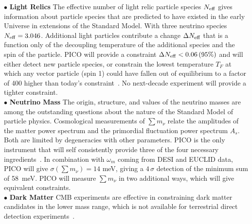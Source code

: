 \documentclass[PICOAPC.tex]{subfiles}
\begin{document}
$\bullet$ {\bf Light Relics} \hspace{0.1in} The effective number of light relic particle species ${N_{\rm eff}}$ gives information about particle species that are predicted to have existed in the early Universe in extensions of the Standard Model. With three neutrino species ${N_{\rm eff}} = 3.046$. Additional light particles contribute a change $\Delta {N_{\rm eff}}$ that is a function only of the decoupling temperature of the additional species and the spin of the particle. PICO will provide a constraint $\Delta {N_{\rm eff}} < 0.06 \, (95\%)$ and will either detect new particle species, or constrain the lowest temperature $T_{F}$ at which any vector particle (spin 1) could have fallen out of equilibrium to a factor of 400 higher than today's constraint~\citep{green_swp}. No next-decade experiment will provide a tighter constraint.   \\ 
%
$\bullet$ {\bf Neutrino Mass} \hspace{0.1in} \label{neutrino_fundamental} The origin, structure, and values of the neutrino masses are among the outstanding questions about the nature of the Standard Model of particle physics.  
Cosmological measurements of $\sum m_\nu$ relate the amplitudes of the matter power spectrum and the primordial fluctuation power spectrum $A_s$.  Both are limited by degeneracies with other parameters. PICO is the only instrument that will self consistently provide three of the four necessary ingredients~\citep{green_swp,dvorkin_swp}. 
In combination with $\omega_m$ coming from DESI and EUCLID data, PICO will give $\sigma(\sum m_\nu) = 14$ meV, giving a $4\,\sigma$ detection of the minimum sum of 58~meV. PICO will measure  $\sum m_\nu$ in two additional ways, which will give equivalent constraints. \\
%
$\bullet$ {\bf Dark Matter} \hspace{0.1in} \ac{CMB} experiments are effective in constraining dark matter candidates in the lower mass range, which is not available for terrestrial direct detection experiments~\citep{Slatyer2009,Galli2009,Huetsi2009,Huetsi2011,Madhavacheril:2013cna,Green:2018pmd}. 
\end{document}
